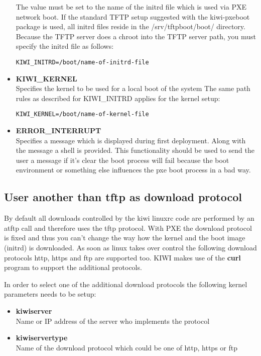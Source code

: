 \begin{itemize}
         The value must be set to the name of the initrd file which is
         used via PXE network boot. If the standard TFTP setup suggested
         with the kiwi-pxeboot package is used, all initrd files reside
         in the /srv/tftpboot/boot/ directory. Because the TFTP server
         does a chroot into the TFTP server path, you must specify the
         initrd file as follows:
\begin{verbatim}
KIWI_INITRD=/boot/name-of-initrd-file
\end{verbatim}
    \item \textbf{KIWI\_KERNEL}\\
         Specifies the kernel to be used for a local boot of the system
         The same path rules as described for KIWI\_INITRD applies for
         the kernel setup:
\begin{verbatim}
KIWI_KERNEL=/boot/name-of-kernel-file
\end{verbatim}
	\item \textbf{ERROR\_INTERRUPT}\\
         Specifies a message which is displayed during first deployment.
         Along with the message a shell is provided. This functionality
         should be used to send the user a message if it's clear the
         boot process will fail because the boot environment or something
         else influences the pxe boot process in a bad way.
\end{itemize}

\subsection{User another than tftp as download protocol}

By default all downloads controlled by the kiwi linuxrc code
are performed by an atftp call and therefore uses the tftp
protocol. With PXE the download protocol is fixed and thus you
can't change the way how the kernel and the boot image (initrd)
is downloaded. As soon as linux takes over control the following
download protocols http, https and ftp are supported too.
KIWI makes use of the \textbf{curl} program to support the
additional protocols.

In order to select one of the additional download protocols
the following kernel parameters needs to be setup:

\begin{itemize}
\item \textbf{kiwiserver}\\
      Name or IP address of the server who implements the protocol
\item \textbf{kiwiservertype}\\
      Name of the download protocol which could be one of http, https 
      or ftp
\end{itemize}

